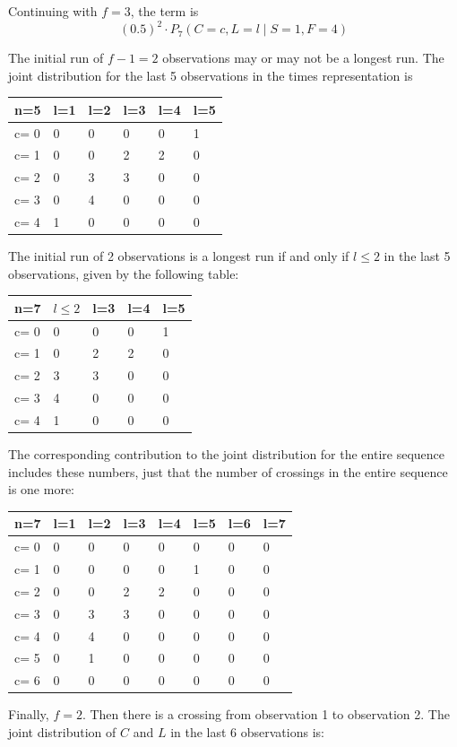 Continuing with $f=3$, the term is $$(0.5)^2 \cdot   P_7 (C=c, L=l \mid S=1,F=4)$$

The initial run of $f-1=2$ observations may or may not be a longest run. The joint distribution for the last 5 observations in the times representation is 

\begin{tabular}{l | l l l l l}
\hline
n=5&l=1&l=2&l=3&l=4&l=5\\
\hline
c= 0& 0& 0& 0& 0& 1\\
c= 1& 0& 0& 2& 2& 0\\
c= 2& 0& 3& 3& 0& 0\\
c= 3& 0& 4& 0& 0& 0\\
c= 4& 1& 0& 0& 0& 0\\
\hline
\end{tabular}

The initial run of 2 observations is a longest run if and only if $l \leq 2$ in the last 5 observations, given by the following table:

\begin{tabular}{l | l l l l}
\hline
n=7&$l \leq 2$&l=3&l=4&l=5\\
\hline
c= 0& 0& 0& 0& 1\\
c= 1& 0& 2& 2& 0\\
c= 2& 3& 3& 0& 0\\
c= 3& 4& 0& 0& 0\\
c= 4& 1& 0& 0& 0\\
\hline
\end{tabular}

The corresponding contribution to the joint distribution for the entire sequence includes these numbers, just that the number of crossings in the entire sequence is one more:

\begin{tabular}{l | l l l l l l l}
\hline
n=7&l=1&l=2&l=3&l=4&l=5&l=6&l=7\\
\hline
c= 0& 0& 0& 0& 0& 0& 0& 0\\
c= 1& 0& 0& 0& 0& 1& 0& 0\\
c= 2& 0& 0& 2& 2& 0& 0& 0\\
c= 3& 0& 3& 3& 0& 0& 0& 0\\
c= 4& 0& 4& 0& 0& 0& 0& 0\\
c= 5& 0& 1& 0& 0& 0& 0& 0\\
c= 6& 0& 0& 0& 0& 0& 0& 0\\
\hline
\end{tabular}


Finally, $f=2$. Then there is a crossing from observation 1 to observation 2. The joint distribution of $C$ and $L$ in the last 6 observations is:

